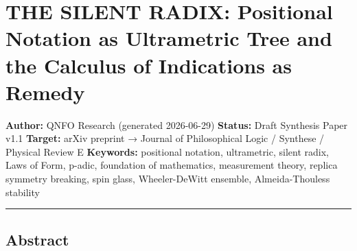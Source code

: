 \documentclass[
]{article}
\author{}
\date{}
\begin{document}
\section{THE SILENT RADIX: Positional Notation as Ultrametric Tree and
the Calculus of Indications as
Remedy}\label{the-silent-radix-positional-notation-as-ultrametric-tree-and-the-calculus-of-indications-as-remedy}

\textbf{Author:} QNFO Research (generated 2026-06-29) \textbf{Status:}
Draft Synthesis Paper v1.1 \textbf{Target:} arXiv preprint → Journal of
Philosophical Logic / Synthese / Physical Review E \textbf{Keywords:}
positional notation, ultrametric, silent radix, Laws of Form, p-adic,
foundation of mathematics, measurement theory, replica symmetry
breaking, spin glass, Wheeler-DeWitt ensemble, Almeida-Thouless
stability

\begin{center}\rule{0.5\linewidth}{0.5pt}\end{center}

\subsection{Abstract}\label{abstract}
\end{document}
